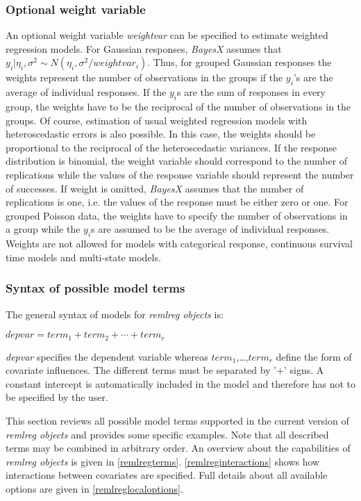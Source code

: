 \subsubsection{Optional weight variable }
\label{remlregweightspecification}

An optional weight variable {\em weightvar} can be specified to
estimate weighted regression models. For Gaussian responses, {\em
BayesX} assumes that $y_i|\eta_i,\sigma^2 \sim
N(\eta_i,\sigma^2/weightvar_i)$. Thus, for grouped Gaussian
responses the weights represent the number of observations in the
groups if the $y_i$'s are the average of individual responses. If
the $y_i$s are the sum of responses in every group, the weights
have to be the reciprocal of the number of observations in the
groups. Of course, estimation of usual weighted regression models
with heteroscedastic errors is also possible. In this case, the
weights should be proportional to the reciprocal of the
heteroscedastic variances. If the response distribution is
binomial, the weight variable should correspond to the number of
replications while the values of the response variable should
represent the number of successes. If weight is omitted, {\em
BayesX} assumes that the number of replications is one, i.e. the
values of the response must be either zero or one. For grouped
Poisson data, the weights have to specify the number of
observations in a group while the $y_i$s are assumed to be the
average of individual responses. Weights are not allowed for
models with categorical response, continuous survival time models
and multi-state models.

\subsubsection{Syntax of possible model terms}
\label{remlregmodelsyntax}

The general syntax of models for {\em remlreg objects} is:

$depvar = term_1 + term_2 + \cdots + term_r$

{\em depvar} specifies the dependent variable whereas
$term_1$,\dots,$term_r$ define the form of covariate influences.
The different terms must be separated by '+' signs. A constant
intercept is automatically included in the model and therefore has
not to be specified by the user.

This section reviews all possible model terms supported in the
current version of {\em remlreg objects} and provides some
specific examples. Note that all described terms may be combined
in arbitrary order. An overview about the capabilities of {\em
remlreg objects} is given in \autoref{remlregterms}.
\autoref{remlreginteractions} shows how interactions between
covariates are specified. Full details about all available options
are given in \autoref{remlreglocaloptions}.

